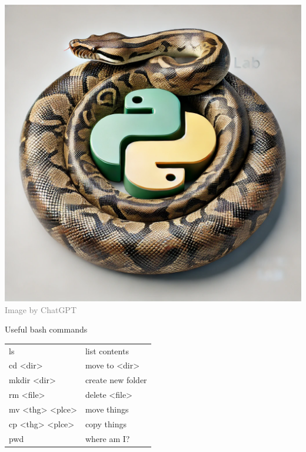 \documentclass{article}
\begin{document}
\hspace{.01\textwidth}\begin{minipage}{.35\textwidth}

  \centering
  \includegraphics[width=.7\linewidth]{figures/chatgpt-python.png}\\
  \textcolor{gray}{\tiny Image by ChatGPT}

  \begin{mybox}{Useful bash commands}

        \centering
        \begin{tabular}{l|l}
            ls & list contents \\
            cd <dir>  & move to <dir> \\ 
            mkdir <dir> & create new folder \\
            rm <file> & delete <file> \\
            mv <thg> <plce> & move things \\
            cp <thg> <plce> & copy things \\
            pwd & where am I?
        \end{tabular}

  \end{mybox}

\end{minipage}




\end{document}
